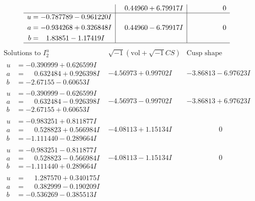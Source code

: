 \documentclass[1p]{elsarticle_modified}
\theoremstyle{definition}
\newcommand{\I}{\sqrt{-1}}
\begin{document}
$$\begin{array}{c|c|c}
 & \phantom{-}0.44960 + 6.79917 I & \phantom{-0.000000 } 0 \\ \hline\begin{aligned}
u &= -0.787789 - 0.961220 I \\
a &= -0.934268 + 0.326848 I \\
b &= \phantom{-}1.83851 - 1.17419 I\end{aligned}
 & \phantom{-}0.44960 - 6.79917 I & \phantom{-0.000000 } 0\\
 \hline 
 \end{array}$$\newpage$$\begin{array}{c|c|c}  
\text{Solutions to }I^u_{2}& \I (\text{vol} + \sqrt{-1}CS) & \text{Cusp shape}\\
 \hline 
\begin{aligned}
u &= -0.390999 + 0.626599 I \\
a &= \phantom{-}0.632484 + 0.926398 I \\
b &= -2.67155 - 0.60653 I\end{aligned}
 & -4.56973 + 0.99702 I & -3.86813 - 6.97623 I \\ \hline\begin{aligned}
u &= -0.390999 - 0.626599 I \\
a &= \phantom{-}0.632484 - 0.926398 I \\
b &= -2.67155 + 0.60653 I\end{aligned}
 & -4.56973 - 0.99702 I & -3.86813 + 6.97623 I \\ \hline\begin{aligned}
u &= -0.983251 + 0.811877 I \\
a &= \phantom{-}0.528823 + 0.566984 I \\
b &= -1.111440 - 0.289664 I\end{aligned}
 & -4.08113 + 1.15134 I & \phantom{-0.000000 } 0 \\ \hline\begin{aligned}
u &= -0.983251 - 0.811877 I \\
a &= \phantom{-}0.528823 - 0.566984 I \\
b &= -1.111440 + 0.289664 I\end{aligned}
 & -4.08113 - 1.15134 I & \phantom{-0.000000 } 0 \\ \hline\begin{aligned}
u &= \phantom{-}1.287570 + 0.340175 I \\
a &= \phantom{-}0.382999 - 0.190209 I \\
b &= -0.536269 - 0.385513 I\end{aligned}

\end{array}$$
\end{document}
